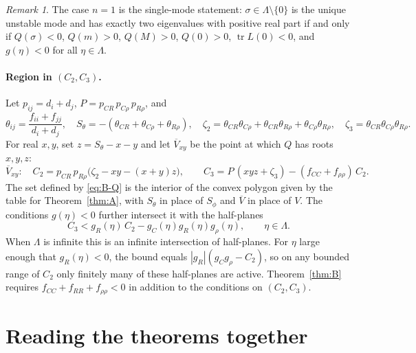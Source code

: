 \documentclass[11pt]{article}
\theoremstyle{remark}
\newtheorem{remark}{Remark}
\begin{document}
\begin{remark}
The case $n=1$ is the single-mode statement: $\sigma\in\Lambda\setminus\{0\}$ is the unique unstable mode and has exactly two eigenvalues with positive real part if and only if $Q(\sigma)<0$, $Q(m)>0$, $Q(M)>0$, $Q(0)>0$, $\operatorname{tr}L(0)<0$, and $g(\eta)<0$ for all $\eta\in\Lambda$.
\end{remark}

\paragraph{Region in $(C_2,C_3)$.} Let $p_{ij}=d_i+d_j$, $P=p_{CR}\,p_{C\rho}\,p_{R\rho}$, and
\[
\theta_{ij}=\frac{f_{ii}+f_{jj}}{d_i+d_j},\quad
S_\theta=-(\theta_{CR}+\theta_{C\rho}+\theta_{R\rho}),\quad
\zeta_2=\theta_{CR}\theta_{C\rho}+\theta_{CR}\theta_{R\rho}+\theta_{C\rho}\theta_{R\rho},\quad
\zeta_3=\theta_{CR}\theta_{C\rho}\theta_{R\rho}.
\]
For real $x,y$, set $z=S_\theta-x-y$ and let $\overline{V}_{xy}$ be the point at which $Q$ has roots $x,y,z$:
\[
\overline{V}_{xy}:\quad
C_2=p_{CR}\,p_{R\rho}\bigl(\zeta_2-xy-(x+y)z\bigr),\qquad
C_3=P\,(xyz+\zeta_3)-(f_{CC}+f_{\rho\rho})\,C_2.
\]
The set defined by \eqref{eq:B-Q} is the interior of the convex polygon given by the table for Theorem~\ref{thm:A}, with $S_\theta$ in place of $S_\phi$ and $\overline{V}$ in place of $V$. The conditions $g(\eta)<0$ further intersect it with the half-planes
\[
C_3<g_R(\eta)\,C_2-g_C(\eta)g_R(\eta)g_\rho(\eta),\qquad \eta\in\Lambda.
\]
When $\Lambda$ is infinite this is an infinite intersection of half-planes. For $\eta$ large enough that $g_R(\eta)<0$, the bound equals $|g_R|(g_Cg_\rho-C_2)$, so on any bounded range of $C_2$ only finitely many of these half-planes are active. Theorem~\ref{thm:B} requires $f_{CC}+f_{RR}+f_{\rho\rho}<0$ in addition to the conditions on $(C_2,C_3)$.

\section{Reading the theorems together}
\end{document}
